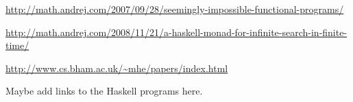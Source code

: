 \documentclass%
[%
Screen4to3,
]{foils}
\begin{document}

\begin{footnotesize}
  
\url{http://math.andrej.com/2007/09/28/seemingly-impossible-functional-programs/}

\url{http://math.andrej.com/2008/11/21/a-haskell-monad-for-infinite-search-in-finite-time/}

\url{http://www.cs.bham.ac.uk/~mhe/papers/index.html}

Maybe add links to the Haskell programs here.

\end{footnotesize}
\end{document}
